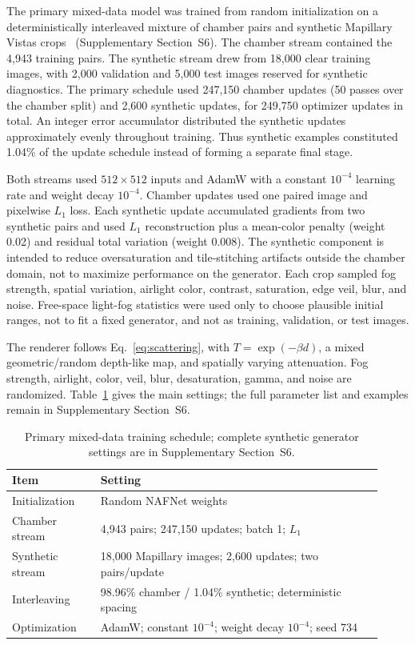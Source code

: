 \documentclass{optica-article}
\begin{document}
The primary mixed-data model was trained from random initialization on a
deterministically interleaved mixture of chamber pairs and synthetic
Mapillary Vistas crops~\cite{neuhold2017mapillary} (Supplementary
Section~S6). The chamber stream contained the 4{,}943 training pairs.
The synthetic stream drew from 18{,}000 clear training images, with
2{,}000 validation and 5{,}000 test images reserved for synthetic
diagnostics. The primary schedule used 247{,}150 chamber updates
(50 passes over the chamber split) and 2{,}600 synthetic updates,
for 249{,}750 optimizer updates in total. An integer error
accumulator distributed the synthetic updates approximately evenly
throughout training. Thus synthetic examples constituted 1.04\% of
the update schedule instead of forming a separate final stage.

Both streams used $512\times512$ inputs and AdamW
\cite{loshchilov2019adamw} with a constant $10^{-4}$ learning rate
and weight decay $10^{-4}$. Chamber updates used one paired image
and pixelwise $L_1$ loss. Each synthetic update accumulated gradients
from two synthetic pairs and used $L_1$ reconstruction plus a
mean-color penalty (weight 0.02) and residual total variation
(weight 0.008). The synthetic component is intended to reduce
oversaturation and tile-stitching artifacts outside the chamber
domain, not to maximize performance on the generator. Each crop
sampled fog strength, spatial variation, airlight color, contrast,
saturation, edge veil, blur, and noise. Free-space light-fog
statistics were used only to choose plausible initial ranges, not to
fit a fixed generator, and not as training, validation, or test
images.

The renderer follows Eq.~\ref{eq:scattering}, with
$T=\exp(-\beta d)$, a mixed geometric/random depth-like map, and
spatially varying attenuation. Fog strength, airlight, color, veil,
blur, desaturation, gamma, and noise are randomized.
Table~\ref{tab:mixed_settings_short} gives the main settings; the
full parameter list and examples remain in Supplementary Section~S6.

\begin{table}[htbp]
\centering
\footnotesize
\setlength{\tabcolsep}{4pt}
\renewcommand{\arraystretch}{0.92}
\caption{Primary mixed-data training schedule; complete synthetic
generator settings are in Supplementary Section~S6.}
\label{tab:mixed_settings_short}
\begin{tabular}{@{}p{0.22\linewidth}p{0.70\linewidth}@{}}
\toprule
\textbf{Item} & \textbf{Setting} \\
\midrule
Initialization & Random NAFNet weights \\
Chamber stream & 4{,}943 pairs; 247{,}150 updates; batch 1; $L_1$ \\
Synthetic stream & 18{,}000 Mapillary images; 2{,}600 updates; two pairs/update \\
Interleaving & 98.96\% chamber / 1.04\% synthetic; deterministic spacing \\
Optimization & AdamW; constant $10^{-4}$; weight decay $10^{-4}$; seed 734 \\
\bottomrule
\end{tabular}
\end{table}
\end{document}
